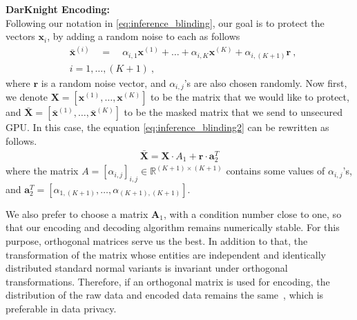 \textbf{DarKnight Encoding:}\\ 
Following our notation in \eqref{eq:inference_blinding}, our goal is to protect the vectors $\mathbf x_i$, by adding a random noise to each as follows
\begin{align}\label{eq:inference_blinding2}
&\bar{\mathbf x}^{(i)}\quad= \quad \alpha_{i,1} \mathbf{x}^{(1)} + \dots+ \alpha_{i,K} \mathbf{x}^{(K)}  +\alpha_{i,(K+1)} \mathbf{r}~,\nonumber\\ &i=1,\dots,(K+1)~,
\end{align}
where $\mathbf r$ is a random noise vector, and $\alpha_{i,j}$'s are also chosen randomly. 
Now first, we denote $\mathbf X=[\mathbf x^{(1)},\dots,\mathbf x^{(K)}]$ to be the matrix that we would like to protect, and $\bar{\mathbf X}=[\bar{\mathbf x}^{(1)},\dots,\bar{\mathbf x}^{(K)}]$ to be the masked matrix that we send to unsecured GPU. In this case, the equation \eqref{eq:inference_blinding2} can be rewritten as follows. 
\begin{align}
    \bar{\mathbf X}=\mathbf X\cdot A_1 + \mathbf r\cdot \mathbf a_2^T
\end{align}
where the matrix $A=[\alpha_{i,j}]_{i,j}\in\mathbb R^{(K+1)\times (K+1)}$ contains some values of $\alpha_{i,j}$'s, and $\mathbf a_2^T=[\alpha_{1,(K+1)},\dots,\alpha_{(K+1),(K+1)}]$. 

We also prefer to choose a matrix $\mathbf A_1$, with a condition number close to one, so that our encoding and decoding algorithm remains numerically stable. For this purpose, orthogonal matrices serve us the best. In addition to that, the transformation of the matrix whose entities are independent and identically distributed standard normal variants is invariant under orthogonal transformations. Therefore, if an orthogonal matrix is used for encoding, the distribution of the raw data and encoded data remains the same~\citep{kim1986method}, which is preferable in data privacy.

